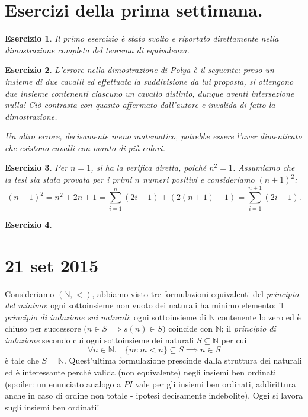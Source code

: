 \documentclass[fontsize = 11 pt, paper=A4, oneside, index=totoc, hyperref]{book}
\theoremstyle{definition}
\theoremstyle{plain}
\newtheorem{exe}{Esercizio}[section]
\newcommand{\N}{\mathbb{N}}
\begin{document}
\section{Esercizi della prima settimana.}
\begin{exe}
  Il primo esercizio è stato svolto e riportato direttamente nella dimostrazione completa del teorema di equivalenza.
\end{exe}
\begin{exe}
  L'errore nella dimostrazione di Polya è il seguente: preso un insieme di due cavalli ed effettuata la suddivisione da lui proposta, si ottengono due insieme contenenti ciascuno un cavallo distinto, dunque aventi intersezione nulla! Ciò contrasta con quanto affermato dall'autore e invalida di fatto la dimostrazione.

  Un altro errore, decisamente meno matematico, potrebbe essere l'aver dimenticato che esistono cavalli con manto di più colori.
\end{exe}
\begin{exe}
  Per \(n = 1\), si ha la verifica diretta, poiché \(n^2 = 1\). Assumiamo che la tesi sia stata provata per i primi \(n\) numeri positivi e consideriamo \((n+1)^2\):
  \begin{equation}
    (n+1)^2 = n^2 + 2n + 1 = \sum_{i=1}^n (2i - 1) + (2(n + 1) - 1) = \sum_{i = 1}^{n+1}(2i - 1).
  \end{equation}
\end{exe}
\begin{exe}
\end{exe}

\section{21 set 2015}

Consideriamo \((\N, <)\), abbiamo visto tre formulazioni equivalenti del \emph{principio del minimo}: ogni sottoinsieme non vuoto dei naturali ha minimo elemento; il \emph{principio di induzione sui naturali}: ogni sottoinsieme di \(\N\) contenente lo zero ed è chiuso per successore (\(n \in S \implies s(n) \in S)\) coincide con \(\N\); il \emph{principio di induzione} secondo cui ogni sottoinsieme dei naturali \(S \subseteq \N\) per cui
\begin{equation}
  \forall n \in \N.\quad \lbrace m \colon m < n\rbrace \subseteq S \implies n \in S
\end{equation}
è tale che \(S = \N\). Quest'ultima formulazione prescinde dalla struttura dei naturali ed è interessante perché valida (non equivalente) negli insiemi ben ordinati (spoiler: un enunciato analogo a \(PI\) vale per gli insiemi ben ordinati, addirittura anche in caso di ordine non totale - ipotesi decisamente indebolite). Oggi si lavora sugli insiemi ben ordinati!
\end{document}
